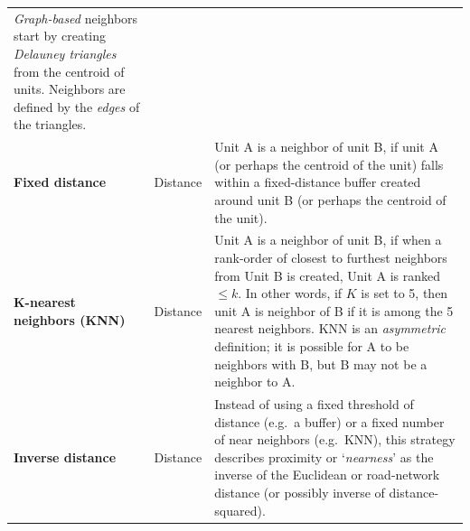 \documentclass[
]{book}
\begin{document}
\begin{longtable}[]{@{}lll@{}}
\begin{minipage}[t]{0.63\columnwidth}
\emph{Graph-based} neighbors start by creating \emph{Delauney triangles} from the centroid of units. Neighbors are defined by the \emph{edges} of the triangles.\strut
\end{minipage}\tabularnewline
\begin{minipage}[t]{0.13\columnwidth}\raggedright
\textbf{Fixed distance}\strut
\end{minipage} & \begin{minipage}[t]{0.14\columnwidth}\raggedright
Distance\strut
\end{minipage} & \begin{minipage}[t]{0.63\columnwidth}\raggedright
Unit A is a neighbor of unit B, if unit A (or perhaps the centroid of the unit) falls within a fixed-distance buffer created around unit B (or perhaps the centroid of the unit).\strut
\end{minipage}\tabularnewline
\begin{minipage}[t]{0.13\columnwidth}\raggedright
\textbf{K-nearest neighbors (KNN)}\strut
\end{minipage} & \begin{minipage}[t]{0.14\columnwidth}\raggedright
Distance\strut
\end{minipage} & \begin{minipage}[t]{0.63\columnwidth}\raggedright
Unit A is a neighbor of unit B, if when a rank-order of closest to furthest neighbors from Unit B is created, Unit A is ranked \(\leq k\). In other words, if \(K\) is set to 5, then unit A is neighbor of B if it is among the 5 nearest neighbors. KNN is an \emph{asymmetric} definition; it is possible for A to be neighbors with B, but B may not be a neighbor to A.\strut
\end{minipage}\tabularnewline
\begin{minipage}[t]{0.13\columnwidth}\raggedright
\textbf{Inverse distance}\strut
\end{minipage} & \begin{minipage}[t]{0.14\columnwidth}\raggedright
Distance\strut
\end{minipage} & \begin{minipage}[t]{0.63\columnwidth}\raggedright
Instead of using a fixed threshold of distance (e.g.~a buffer) or a fixed number of near neighbors (e.g.~KNN), this strategy describes proximity or `\emph{nearness}' as the inverse of the Euclidean or road-network distance (or possibly inverse of distance-squared).\strut
\end{minipage}\tabularnewline
\bottomrule
\end{longtable}
\end{document}
